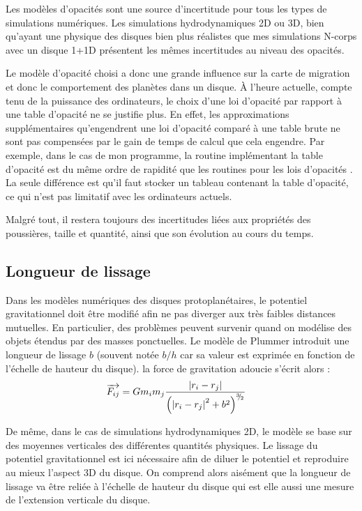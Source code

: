 \bigskip

Les modèles d'opacités sont une source d'incertitude pour tous les types de simulations numériques. Les simulations hydrodynamiques 2D ou 3D, bien qu'ayant une physique des disques bien plus réalistes que mes simulations N-corps avec un disque 1+1D présentent les mêmes incertitudes au niveau des opacités.

Le modèle d'opacité choisi a donc une grande influence sur la carte de migration et donc le comportement des planètes dans un
disque. À l'heure actuelle, compte tenu de la puissance des ordinateurs, le choix d'une loi d'opacité par rapport à une table
d'opacité ne se justifie plus. En effet, les approximations supplémentaires qu'engendrent une loi d'opacité comparé
à une table brute ne sont pas compensées par le gain de temps de calcul que cela engendre. Par exemple, dans le cas de mon programme, la routine
implémentant la table d'opacité \cite{hure2000transition} est du même ordre de rapidité que les routines pour les lois d'opacités \citep{bell1994FU, zhu2009nonsteady, chambers2009analytic}. La seule différence est qu'il
faut stocker un tableau contenant la table d'opacité, ce qui n'est pas limitatif avec les ordinateurs actuels.

Malgré tout, il restera toujours des incertitudes liées aux propriétés des poussières, taille et quantité, ainsi que son évolution
au cours du temps. 

\subsection{Longueur de lissage}
Dans les modèles numériques des disques protoplanétaires, le potentiel gravitationnel doit être modifié afin ne pas diverger aux
très faibles distances mutuelles. En particulier, des problèmes peuvent survenir quand on modélise des objets étendus par des
masses ponctuelles. Le modèle de Plummer introduit une longueur de lissage $b$ (souvent notée $b/h$ car sa valeur est exprimée
en fonction de l'échelle de hauteur du disque). la force de gravitation adoucie s'écrit alors : 
\begin{align}
{\overrightarrow{F_{ij}}} &= G m_i m_j \frac{\left|r_i - r_j\right|}{\left(\left|r_i - r_j\right|^2 + b^2\right)^{{}^{3\!\!}/ _{\!2}}}
\end{align}


De même, dans le cas de simulations hydrodynamiques 2D, le modèle se base sur des moyennes verticales des différentes quantités
physiques. Le lissage du potentiel gravitationnel est ici nécessaire afin de diluer le potentiel et reproduire au mieux l'aspect
3D du disque. On comprend alors aisément que la longueur de lissage va être reliée à l'échelle de hauteur du disque qui est elle
aussi une mesure de l'extension verticale du disque. 

